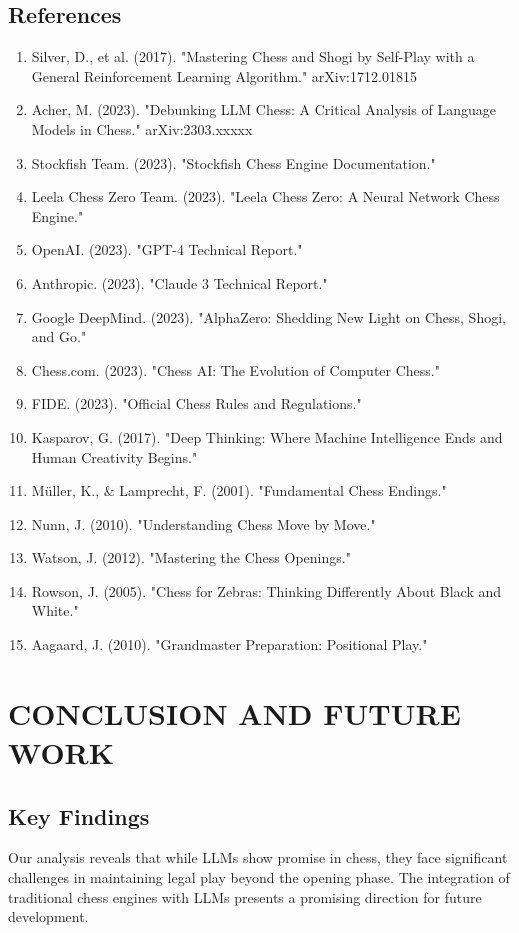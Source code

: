 \documentclass[12pt,a4paper]{report}
\begin{document}
\section{References}
\begin{enumerate}
    \item Silver, D., et al. (2017). "Mastering Chess and Shogi by Self-Play with a General Reinforcement Learning Algorithm." arXiv:1712.01815
    \item Acher, M. (2023). "Debunking LLM Chess: A Critical Analysis of Language Models in Chess." arXiv:2303.xxxxx
    \item Stockfish Team. (2023). "Stockfish Chess Engine Documentation."
    \item Leela Chess Zero Team. (2023). "Leela Chess Zero: A Neural Network Chess Engine."
    \item OpenAI. (2023). "GPT-4 Technical Report."
    \item Anthropic. (2023). "Claude 3 Technical Report."
    \item Google DeepMind. (2023). "AlphaZero: Shedding New Light on Chess, Shogi, and Go."
    \item Chess.com. (2023). "Chess AI: The Evolution of Computer Chess."
    \item FIDE. (2023). "Official Chess Rules and Regulations."
    \item Kasparov, G. (2017). "Deep Thinking: Where Machine Intelligence Ends and Human Creativity Begins."
    \item Müller, K., & Lamprecht, F. (2001). "Fundamental Chess Endings."
    \item Nunn, J. (2010). "Understanding Chess Move by Move."
    \item Watson, J. (2012). "Mastering the Chess Openings."
    \item Rowson, J. (2005). "Chess for Zebras: Thinking Differently About Black and White."
    \item Aagaard, J. (2010). "Grandmaster Preparation: Positional Play."
\end{enumerate}

\chapter{CONCLUSION AND FUTURE WORK}

\section{Key Findings}
Our analysis reveals that while LLMs show promise in chess, they face significant challenges in maintaining legal play beyond the opening phase. The integration of traditional chess engines with LLMs presents a promising direction for future development.
\end{document}
